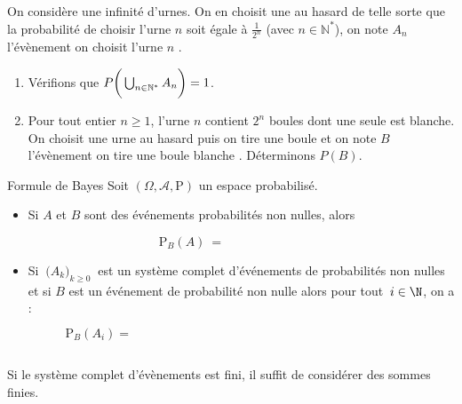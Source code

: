 \documentclass[french,11pt,twoside]{VcCours}
\renewcommand{\P}{\text{P}}
\begin{document}
\begin{Exemple} On considère une infinité d'urnes. On en choisit une au hasard de telle sorte que la probabilité de choisir l'urne $n$ soit égale à $\frac{1}{2^n}$ (avec $n \in \mathbb{N}^*$), on note $A_n$ l'évènement \og on choisit l'urne $n$ \fg{}.
\begin{enumerate}
\item Vérifions que $P \bigg{(} \bigcup_{n \in \mathbb{N}^*} A_n \bigg{)} = 1$.

\vspace*{5cm}
\item Pour tout entier $n \geq 1$, l'urne $n$ contient $2^n$ boules dont une seule est blanche. On choisit une urne au hasard puis on tire une boule et on note $B$ l'évènement \og on tire une boule blanche \fg{}. Déterminons $P(B)$. 

\end{enumerate}
\end{Exemple}

\begin{Proposition}{Formule de Bayes}
Soit $(\Omega, \mathcal{A}, \P)$ un espace probabilisé.
\begin{itemize}
\item Si $A$ et $B$ sont des événements probabilités non nulles, alors

\[  \P_B(A)\ = \qquad \qquad \qquad \qquad \]

\item Si $\ \big(A_k\big)_{k \geq 0}\ $ est un système complet d'événements de probabilités non nulles et si $B$ est un événement de probabilité non nulle alors pour tout $\,i\in\N$, on a :
$$\P_B(A_i) = \phantom{\frac{\ \P(A_i)\times  \P_{A_i}(B)\ }{ \P(B)} 
= \frac{\P(A_i)\times  \P_{A_i}(B)}{\ \sum\limits_{k=0}^{+\infty} \P(A_k)\times  \P_{A_k}(B)\ }}$$
\end{itemize}
\end{Proposition}

\begin{Remarque}{} Si le système complet d'évènements est fini, il suffit de considérer des sommes finies.
\end{Remarque}
\end{document}
